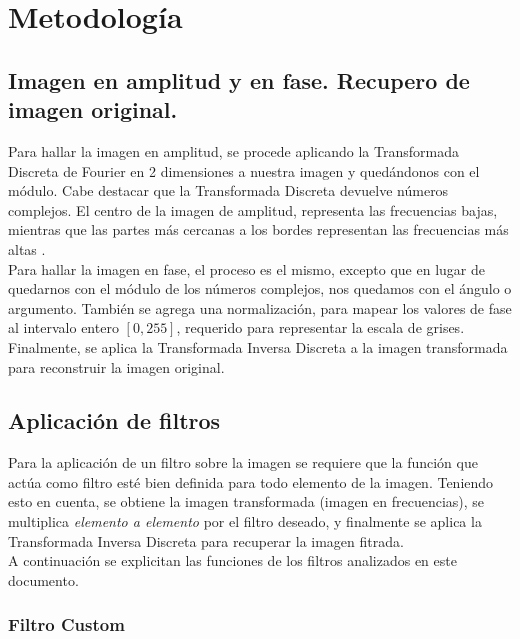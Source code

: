 \documentclass[twocolumn,a4paper,10pt]{article}
\begin{document}
\section{Metodolog\'ia}
\label{sec:metodologia}

\subsection{Imagen en amplitud y en fase. Recupero de imagen original.}

Para hallar la imagen en amplitud, se procede aplicando la Transformada Discreta de Fourier en 2 dimensiones a nuestra imagen y qued\'andonos con el 
m\'odulo. Cabe destacar que la Transformada Discreta devuelve n\'umeros complejos. El centro de la imagen de amplitud, representa las frecuencias bajas, 
mientras que las partes más cercanas a los bordes representan las frecuencias m\'as altas \cite{HIPR2-FourierTransform}.\\

Para hallar la imagen en fase, el proceso es el mismo, excepto que en lugar de quedarnos con el m\'odulo de los n\'umeros complejos, nos quedamos con el 
\'angulo o argumento. Tambi\'en se agrega una normalizaci\'on, para mapear los valores de fase al intervalo entero $[0, 255]$, 
requerido para representar la escala de grises.\\

Finalmente, se aplica la Transformada Inversa Discreta a la imagen transformada para reconstruir la imagen original.\\

\subsection{Aplicaci\'on de filtros}
\label{sec:aplicacionFiltros}

Para la aplicaci\'on de un filtro sobre la imagen se requiere que la funci\'on que act\'ua como filtro est\'e bien definida para todo elemento de la imagen.
Teniendo esto en cuenta, se obtiene la imagen transformada (imagen en frecuencias), se multiplica \textit{elemento a elemento} por el filtro deseado, y 
finalmente se aplica la Transformada Inversa Discreta para recuperar la imagen fitrada. \\

A continuaci\'on se explicitan las funciones de los filtros analizados en este documento. \\

\subsubsection{Filtro Custom}
\end{document}
